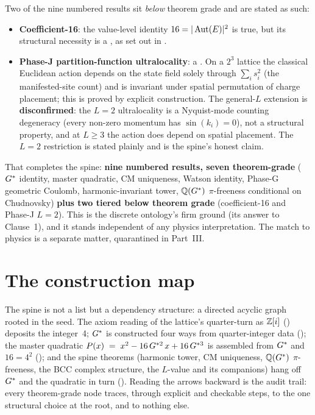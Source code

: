  Two of the nine numbered results sit
\emph{below} theorem grade and are stated as such:
\begin{itemize}[leftmargin=1.4em, itemsep=4pt]
  \item \textbf{Coefficient-16}: the value-level identity $16=|\operatorname{Aut}(E)|^2$
        is true, but its structural necessity is a , as set out in
        .
  \item \textbf{Phase-J partition-function ultralocality}: a
        . On a $2^3$
        lattice the classical Euclidean action depends on the state field solely
        through $\sum_i s_i^2$ (the manifested-site count) and is invariant under
        spatial permutation of charge placement; this is proved by explicit
        construction. The general-$L$ extension is \textbf{disconfirmed}: the
        $L=2$ ultralocality is a Nyquist-mode counting degeneracy (every non-zero
        momentum has $\sin(k_i)=0$), not a structural property, and at $L\ge3$ the
        action does depend on spatial placement. The $L=2$ restriction is stated
        plainly and is the spine's honest claim.
\end{itemize}

 That completes the spine: \textbf{nine numbered
results, seven theorem-grade} ($G^{*}$ identity, master quadratic, CM uniqueness,
Watson identity, Phase-G geometric Coulomb, harmonic-invariant tower, $\mathbb{Q}(G^{*})$
$\pi$-freeness conditional on Chudnovsky) \textbf{plus two tiered below theorem grade}
(coefficient-16 and Phase-J $L=2$). This is the discrete ontology's firm
ground (its answer to Clause~1), and it stands independent of any physics
interpretation. The match to physics is a separate matter, quarantined in
Part~III.

\section{The construction map}\label{sec:map}

The spine is not a list but a dependency structure: a directed acyclic graph
rooted in the seed. The axiom reading of the lattice's quarter-turn as $\mathbb{Z}[i]$
() deposits the integer~4; $G^{*}$ is constructed four ways from
quarter-integer data (); the master quadratic $P(x) \;=\; x^{2} - 16\,G^{*2}\,x + 16\,G^{*3}$ is
assembled from $G^{*}$ and $16=4^2$ (); and the spine
theorems (harmonic tower, CM uniqueness, $\mathbb{Q}(G^{*})$ $\pi$-freeness, the BCC
complex structure, the $L$-value and its companions) hang off $G^{*}$ and the
quadratic in turn (). Reading the arrows backward is the audit
trail: every theorem-grade node traces, through explicit and checkable steps, to
the one structural choice at the root, and to nothing else.
